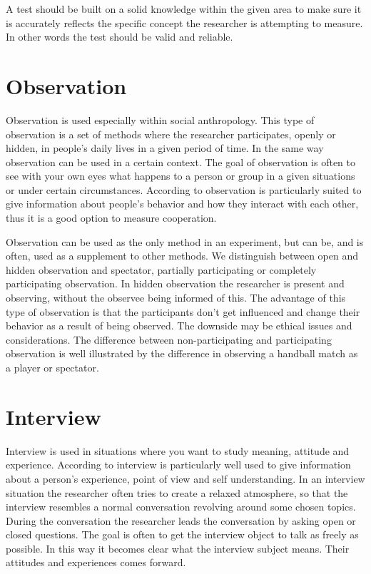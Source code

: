 \bigskip\noindent
A test should be built on a solid knowledge within the given area to make sure it is accurately reflects the specific concept the researcher is attempting to measure. In other words the test should be valid and reliable. 

\section{Observation}
Observation is used especially within social anthropology. This type of observation is a set of methods where the researcher participates, openly or hidden, in people's daily lives in a given period of time\cite{tjora2012kvalitative}. In the same way observation can be used in a certain context. The goal of observation is often to see with your own eyes what happens to a person or group in a given situations or under certain circumstances. According to  observation is particularly suited to give information about people's behavior and how they interact with each other, thus it is a good option to measure cooperation. 

\bigskip\noindent
Observation can be used as the only method in an experiment, but can be, and is often, used as a supplement to other methods. We distinguish between open and hidden observation and spectator, partially participating or completely participating observation. In hidden observation the researcher is present and observing, without the observee being informed of this. The advantage of this type of observation is that the participants don't get influenced and change their behavior as a result of being observed. The downside may be ethical issues and considerations. The difference between non-participating and participating observation is well illustrated by the difference in observing a handball match as a player or spectator. 

\section{Interview}
Interview is used in situations where you want to study meaning, attitude and experience\cite{tjora2012kvalitative}. According to  interview is particularly well used to give information about a person's experience, point of view and self understanding. In an interview situation the researcher often tries to create a relaxed atmosphere, so that the interview resembles a normal conversation revolving around some chosen topics. During the conversation the researcher leads the conversation by asking open or closed questions. The goal is often to get the interview object to talk as freely as possible. In this way it becomes clear what the interview subject means. Their attitudes and experiences comes forward. 


